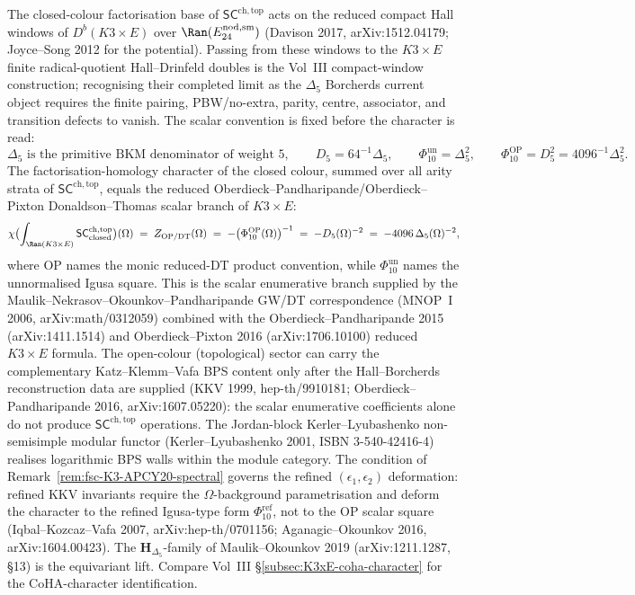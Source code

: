 \begin{remark}
\label{rem:fsc-K3xE-GWDT-character}
The closed-colour factorisation base of $\mathsf{SC}^{\mathrm{ch,top}}$
acts on the reduced compact Hall windows of \(D^b(K3 \times E)\) over
\(\Ran(E^{\mathrm{nod,sm}}_{24})\) (Davison 2017, arXiv:1512.04179;
Joyce--Song 2012 for the potential).  Passing from these windows to the
\(K3\times E\) finite radical-quotient Hall--Drinfeld doubles is the
Vol~III compact-window construction; recognising their completed limit
as the \(\Delta_5\) Borcherds current object requires the finite
pairing, PBW/no-extra, parity, centre, associator, and transition
defects to vanish. The scalar
convention is fixed before the character is read:
\[
 \Delta_5 \text{ is the primitive BKM denominator of weight }5,\qquad
 D_5=64^{-1}\Delta_5,\qquad
 \Phi_{10}^{\mathrm{un}}=\Delta_5^2,\qquad
 \Phi_{10}^{\mathrm{OP}}=D_5^2=4096^{-1}\Delta_5^2 .
\]
The factorisation-homology character of the closed colour, summed over
all arity strata of $\mathsf{SC}^{\mathrm{ch,top}}$, equals the reduced
Oberdieck--Pandharipande/Oberdieck--Pixton
Donaldson--Thomas scalar branch of $K3 \times E$:
\[
 \chi\bigl(\int_{\Ran(K3 \times E)}
 \mathsf{SC}^{\mathrm{ch,top}}_{\mathrm{closed}}\bigr)(\Omega)
 \;=\; Z_{\mathrm{OP/DT}}(\Omega)
 \;=\; -\bigl(\Phi_{10}^{\mathrm{OP}}(\Omega)\bigr)^{-1}
 \;=\; -D_5(\Omega)^{-2}
 \;=\; -4096\,\Delta_5(\Omega)^{-2},
\]
where OP names the monic reduced-DT product convention, while
$\Phi_{10}^{\mathrm{un}}$ names the unnormalised Igusa square. This is
the scalar enumerative branch supplied by the
Maulik--Nekrasov--Okounkov--Pandharipande GW/DT correspondence
(MNOP~I 2006, arXiv:math/0312059) combined with the
Oberdieck--Pandharipande 2015 (arXiv:1411.1514) and
Oberdieck--Pixton 2016 (arXiv:1706.10100) reduced $K3 \times E$
formula. The
open-colour (topological) sector can carry the complementary
Katz--Klemm--Vafa BPS content only after the Hall--Borcherds
reconstruction data are supplied (KKV 1999, hep-th/9910181;
Oberdieck--Pandharipande 2016, arXiv:1607.05220): the scalar
enumerative coefficients alone do not produce
$\mathsf{SC}^{\mathrm{ch,top}}$ operations. The
Jordan-block Kerler--Lyubashenko non-semisimple modular functor
(Kerler--Lyubashenko 2001, ISBN 3-540-42416-4) realises logarithmic
BPS walls within the module category. The condition of
Remark~\ref{rem:fsc-K3-APCY20-spectral} governs the refined
$(\epsilon_1, \epsilon_2)$ deformation: refined KKV invariants
require the $\Omega$-background parametrisation and deform
the character to the refined Igusa-type form
$\Phi_{10}^{\mathrm{ref}}$, not to the OP scalar square
(Iqbal--Kozcaz--Vafa 2007,
arXiv:hep-th/0701156; Aganagic--Okounkov 2016, arXiv:1604.00423). The
$\mathbf{H}_{\Delta_5}$-family of Maulik--Okounkov 2019 (arXiv:1211.1287,
\S13) is the equivariant lift. Compare Vol~III
\S\ref{subsec:K3xE-coha-character} for the CoHA-character
identification.
\end{remark}
